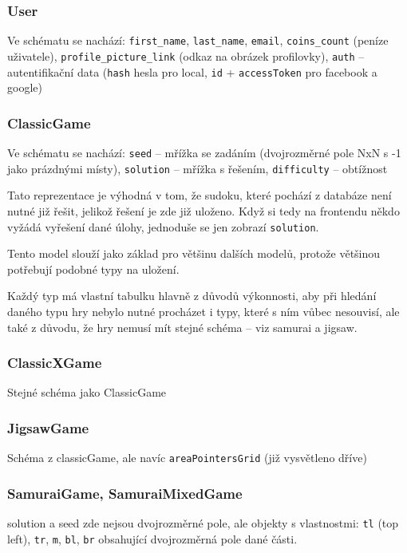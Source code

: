 \documentclass[a4paper,oneside,12pt]{report}
\begin{document}
\subsubsection{User}
Ve schématu se nachází: \texttt{first\_name}, \texttt{last\_name}, \texttt{email}, \texttt{coins\_count} (peníze uživatele), \texttt{profile\_picture\_link} (odkaz na obrázek profilovky), \texttt{auth} -- autentifikační data (\texttt{hash} hesla pro local, \texttt{id} + \texttt{accessToken} pro facebook a google)

\subsubsection{ClassicGame}
Ve schématu se nachází: \texttt{seed} -- mřížka se zadáním (dvojrozměrné pole NxN s -1 jako prázdnými místy), \texttt{solution} -- mřížka s řešením, \texttt{difficulty} -- obtížnost

Tato reprezentace je výhodná v tom, že sudoku, které pochází z databáze není nutné již řešit, jelikož řešení je zde již uloženo. Když si tedy na frontendu někdo vyžádá vyřešení dané úlohy, jednoduše se jen zobrazí \texttt{solution}. 

Tento model slouží jako základ pro většinu dalších modelů, protože většinou potřebují podobné typy na uložení.

Každý typ má vlastní tabulku hlavně z důvodů výkonnosti, aby při hledání daného typu hry nebylo nutné procházet i typy, které s ním vůbec nesouvisí, ale také z důvodu, že hry nemusí mít stejné schéma -- viz samurai a jigsaw.

\subsubsection{ClassicXGame}
Stejné schéma jako ClassicGame

\subsubsection{JigsawGame}
Schéma z classicGame, ale navíc \texttt{areaPointersGrid} (již vysvětleno dříve)

\subsubsection{SamuraiGame, SamuraiMixedGame}
solution a seed zde nejsou dvojrozměrné pole, ale objekty s vlastnostmi: \texttt{tl} (top left), \texttt{tr}, \texttt{m}, \texttt{bl}, \texttt{br} obsahující dvojrozměrná pole dané části.
\end{document}
